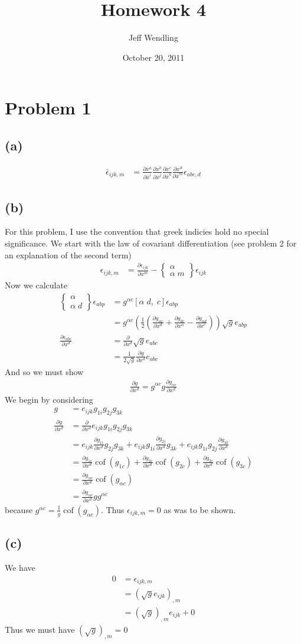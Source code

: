 \documentclass[12pt]{article}
\title{Homework 4}
\author{Jeff Wendling}
\date{October 20, 2011}
\newcommand{\eq}[1]{\begin{align*}#1\end{align*}}
\newcommand{\p}[2]{\frac{\partial#1}{\partial#2}}
\newcommand{\co}[2]{\p{x^#1}{\bar{x}^#2}}
\newcommand{\crsf}[3]{\left[#1\;#2,\;#3\right]}
\newcommand{\crss}[3]{\left\{\begin{array}{c}#1\\#2\;#3\end{array}\right\}}
\newcommand{\on}[1]{\operatorname{#1}}
\begin{document}
\maketitle
\section*{Problem 1}
\subsection*{(a)}
\eq{
	\bar{\epsilon}_{ijk,m} &= \co{a}{i}\co{b}{j}\co{c}{k}\co{d}{m}\epsilon_{abc,d}
}
\subsection*{(b)}
For this problem, I use the convention that greek indicies hold no special significance. We start with the law of covariant differentiation (see problem 2 for an explanation of the second term)
\eq{
	\epsilon_{ijk,m} &= \p{\epsilon_{ijk}}{x^m} - \crss{\alpha}{\alpha}{m}\epsilon_{ijk}
}
Now we calculate
\eq{
	\crss{\alpha}{\alpha}{d}\epsilon_{abp} &= g^{\alpha c}\crsf{\alpha}{d}{c}\epsilon_{abp}\\
	&= g^{\alpha c}\left(\frac{1}{2}( \p{g_{\alpha c}}{x^d} + \p{g_{dc}}{x^\alpha} - \p{g_{\alpha d}}{x^c})\right)\sqrt{g}e_{abp}\\
	\p{\epsilon_{abc}}{x^d} &= \p{}{x^d}\sqrt{g}e_{abc}\\
	&= \frac{1}{2\sqrt{g}} \p{g}{x^d}e_{abc}
}
And so we must show
\eq{
	\p{g}{x^d} = g^{\alpha c}g \p{g_{\alpha c}}{x^d}
}
We begin by considering
\eq{
	g &= e_{ijk}g_{1i}g_{2j}g_{3k}\\
	\p{g}{x^d} &= \p{}{x^d}e_{ijk}g_{1i}g_{2j}g_{3k}\\
	&= e_{ijk}\p{g_{1i}}{x^d}g_{2j}g_{3k} + e_{ijk}g_{1i}\p{g_{2j}}{x^d}g_{3k} + e_{ijk}g_{1i}g_{2j}\p{g_{3k}}{x^d}\\
	&= \p{g_{1c}}{x^d}\on{cof}(g_{1c}) + \p{g_{2c}}{x^d}\on{cof}(g_{2c}) + \p{g_{3c}}{x^d}\on{cof}(g_{3c})\\
	&= \p{g_{\alpha c}}{x^d}\on{cof}(g_{\alpha c})\\
	&= \p{g_{\alpha c}}{x^d} g g^{\alpha c}
}
because $g^{\alpha c} = \frac{1}{g}\on{cof}(g_{\alpha c})$. Thus $\epsilon_{ijk,m} = 0$ as was to be shown.
\subsection*{(c)}
We have
\eq{
	0 &= \epsilon_{ijk,m}\\
	&= (\sqrt{g}e_{ijk})_{,m}\\
	&= (\sqrt{g})_{,m}e_{ijk} + 0
}
Thus we must have $(\sqrt{g})_{,m} = 0$
\end{document}
